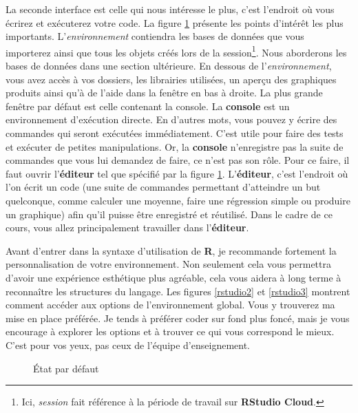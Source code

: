 \documentclass[10.5pt,a4paper]{article}
\begin{document}
La seconde interface est celle qui nous intéresse le plus, c'est l'endroit où vous écrirez et exécuterez votre code. La figure \ref{rstudio1} présente les points d'intérêt les plus importants. L'\emph{environnement} contiendra les bases de données que vous importerez ainsi que tous les objets créés lors de la session\footnote{Ici, \emph{session} fait référence à la période de travail sur \textbf{RStudio Cloud}.}. Nous aborderons les bases de données dans une section ultérieure. En dessous de l'\emph{environnement}, vous avez accès à vos dossiers, les librairies utilisées, un aperçu des graphiques produits ainsi qu'à de l'aide dans la fenêtre en bas à droite. La plus grande fenêtre par défaut est celle contenant la console. La \textbf{console} est un environnement d'exécution directe. En d'autres mots, vous pouvez y écrire des commandes qui seront exécutées immédiatement. C'est utile pour faire des tests et exécuter de petites manipulations. Or, la \textbf{console} n'enregistre pas la suite de commandes que vous lui demandez de faire, ce n'est pas son rôle. Pour ce faire, il faut ouvrir l'\textbf{éditeur} tel que spécifié par la figure \ref{rstudio1}. L'\textbf{éditeur}, c'est l'endroit où l'on écrit un code (une suite de commandes permettant d'atteindre un but quelconque, comme calculer une moyenne, faire une régression simple ou produire un graphique) afin qu'il puisse être enregistré et réutilisé. Dans le cadre de ce cours, vous allez principalement travailler dans l'\textbf{éditeur}.

Avant d'entrer dans la syntaxe d'utilisation de \textbf{R}, je recommande fortement la personnalisation de votre environnement. Non seulement cela vous permettra d'avoir une expérience esthétique plus agréable, cela vous aidera à long terme à reconnaître les structures du langage. Les figures \ref{rstudio2} et \ref{rstudio3} montrent comment accéder aux options de l'environnement global. Vous y trouverez ma mise en place préférée. Je tends à préférer coder sur fond plus foncé, mais je vous encourage à explorer les options et à trouver ce qui vous correspond le mieux. C'est pour vos yeux, pas ceux de l'équipe d'enseignement. 

\begin{figure}[H]
  \centering
  \caption{État par défaut}
  \label{rstudio1}
\end{figure}
\end{document}
